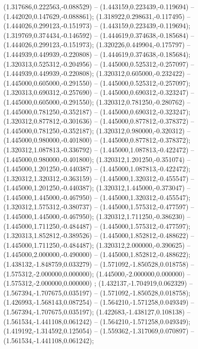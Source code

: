  (1.317686,0.222563,-0.088529) -- (1.443159,0.223439,-0.119694) -- (1.442020,0.147629,-0.088861);
 (1.318922,0.298631,-0.117495) -- (1.444026,0.299123,-0.151973) -- (1.443159,0.223439,-0.119694);
 (1.319769,0.374434,-0.146592) -- (1.444619,0.374638,-0.185684) -- (1.444026,0.299123,-0.151973);
 (1.320226,0.449904,-0.175797) -- (1.444939,0.449939,-0.220808) -- (1.444619,0.374638,-0.185684);
 (1.320313,0.525312,-0.204956) -- (1.445000,0.525312,-0.257097) -- (1.444939,0.449939,-0.220808);
 (1.320312,0.605000,-0.232422) -- (1.445000,0.605000,-0.291550) -- (1.445000,0.525312,-0.257097);
 (1.320313,0.690312,-0.257690) -- (1.445000,0.690312,-0.323247) -- (1.445000,0.605000,-0.291550);
 (1.320312,0.781250,-0.280762) -- (1.445000,0.781250,-0.352187) -- (1.445000,0.690312,-0.323247);
 (1.320312,0.877812,-0.301636) -- (1.445000,0.877812,-0.378372) -- (1.445000,0.781250,-0.352187);
 (1.320312,0.980000,-0.320312) -- (1.445000,0.980000,-0.401800) -- (1.445000,0.877812,-0.378372);
 (1.320312,1.087813,-0.336792) -- (1.445000,1.087813,-0.422472) -- (1.445000,0.980000,-0.401800);
 (1.320312,1.201250,-0.351074) -- (1.445000,1.201250,-0.440387) -- (1.445000,1.087813,-0.422472);
 (1.320312,1.320312,-0.363159) -- (1.445000,1.320312,-0.455547) -- (1.445000,1.201250,-0.440387);
 (1.320312,1.445000,-0.373047) -- (1.445000,1.445000,-0.467950) -- (1.445000,1.320312,-0.455547);
 (1.320312,1.575312,-0.380737) -- (1.445000,1.575312,-0.477597) -- (1.445000,1.445000,-0.467950);
 (1.320312,1.711250,-0.386230) -- (1.445000,1.711250,-0.484487) -- (1.445000,1.575312,-0.477597);
 (1.320313,1.852812,-0.389526) -- (1.445000,1.852812,-0.488622) -- (1.445000,1.711250,-0.484487);
 (1.320312,2.000000,-0.390625) -- (1.445000,2.000000,-0.490000) -- (1.445000,1.852812,-0.488622);
 (1.438132,-1.848759,0.033279) -- (1.571092,-1.850528,0.018758) -- (1.575312,-2.000000,0.000000);
 (1.445000,-2.000000,0.000000) -- (1.575312,-2.000000,0.000000) ;
 (1.432137,-1.704919,0.062329) -- (1.567394,-1.707675,0.035197) -- (1.571092,-1.850528,0.018758);
 (1.426993,-1.568143,0.087254) -- (1.564210,-1.571258,0.049349) -- (1.567394,-1.707675,0.035197);
 (1.422683,-1.438127,0.108138) -- (1.561534,-1.441108,0.061242) -- (1.564210,-1.571258,0.049349);
 (1.419192,-1.314592,0.125054) -- (1.559362,-1.317069,0.070897) -- (1.561534,-1.441108,0.061242);
